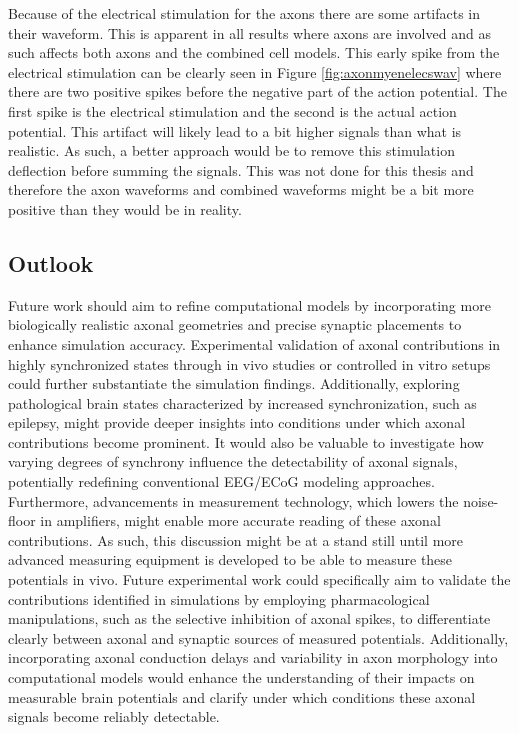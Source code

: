 \documentclass[final, a4paper,masters,en,listoffigures,listoftables,norwegiandates]{NMBU}
\begin{document}
\newline
Because of the electrical stimulation for the axons there are some artifacts in their waveform. This is apparent in all results where axons are involved and as such affects both axons and the combined cell models. This early spike from the electrical stimulation can be clearly seen in Figure \ref{fig:axonmyenelecswav} where there are two positive spikes before the negative part of the action potential. The first spike is the electrical stimulation and the second is the actual action potential. This artifact will likely lead to a bit higher signals than what is realistic. As such, a better approach would be to remove this stimulation deflection before summing the signals. This was not done for this thesis and therefore the axon waveforms and combined waveforms might be a bit more positive than they would be in reality.

\subsection{Outlook}
Future work should aim to refine computational models by incorporating more biologically realistic axonal geometries and precise synaptic placements to enhance simulation accuracy. Experimental validation of axonal contributions in highly synchronized states through in vivo studies or controlled in vitro setups could further substantiate the simulation findings. Additionally, exploring pathological brain states characterized by increased synchronization, such as epilepsy, might provide deeper insights into conditions under which axonal contributions become prominent. It would also be valuable to investigate how varying degrees of synchrony influence the detectability of axonal signals, potentially redefining conventional EEG/ECoG modeling approaches. Furthermore, advancements in measurement technology, which lowers the noise-floor in amplifiers, might enable more accurate reading of these axonal contributions. As such, this discussion might be at a stand still until more advanced measuring equipment is developed to be able to measure these potentials in vivo. Future experimental work could specifically aim to validate the contributions identified in simulations by employing pharmacological manipulations, such as the selective inhibition of axonal spikes, to differentiate clearly between axonal and synaptic sources of measured potentials. Additionally, incorporating axonal conduction delays and variability in axon morphology into computational models would enhance the understanding of their impacts on measurable brain potentials and clarify under which conditions these axonal signals become reliably detectable.
\end{document}
